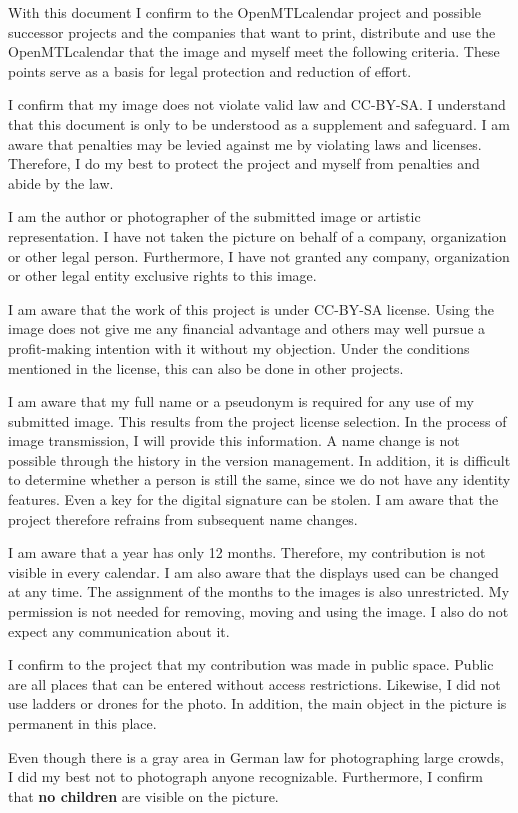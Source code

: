 \documentclass[parskip=half]{scrreprt}
\begin{document}
 
With this document I confirm to the OpenMTLcalendar project and possible successor projects and the companies that want to print, distribute and use the OpenMTLcalendar that the image and myself meet the following criteria. These points serve as a basis for legal protection and reduction of effort.
\begin{contract}
	I confirm that my image does not violate valid law and CC-BY-SA. I understand that this document is only to be understood as a supplement and safeguard. I am aware that penalties may be levied against me by violating laws and licenses. 
	Therefore, I do my best to protect the project and myself from penalties and abide by the law.
	
	I am the author or photographer of the submitted image or artistic representation. I have not taken the picture on behalf of a company, organization or other legal person. Furthermore, I have not granted any company, organization or other legal entity exclusive rights to this image.
	
	I am aware that the work of this project is under CC-BY-SA license. Using the image does not give me any financial advantage and others may well pursue a profit-making intention with it without my objection. Under the conditions mentioned in the license, this can also be done in other projects.
	
	I am aware that my full name or a pseudonym is required for any use of my submitted image. This results from the project license selection. In the process of image transmission, I will provide this information. A name change is not possible through the history in the version management. In addition, it is difficult to determine whether a person is still the same, since we do not have any identity features. Even a key for the digital signature can be stolen. I am aware that the project therefore refrains from subsequent name changes.
	
	I am aware that a year has only 12 months. Therefore, my contribution is not visible in every calendar. I am also aware that the displays used can be changed at any time. The assignment of the months to the images is also unrestricted. My permission is not needed for removing, moving and using the image. I also do not expect any communication about it.
	
	I confirm to the project that my contribution was made in public space. Public are all places that can be entered without access restrictions. Likewise, I did not use ladders or drones for the photo.
	In addition, the main object in the picture is permanent in this place.
	
	Even though there is a gray area in German law for photographing large crowds, I did my best not to photograph anyone recognizable. Furthermore, I confirm that \textbf{no children} are visible on the picture.
	
\end{contract}
\end{document}
